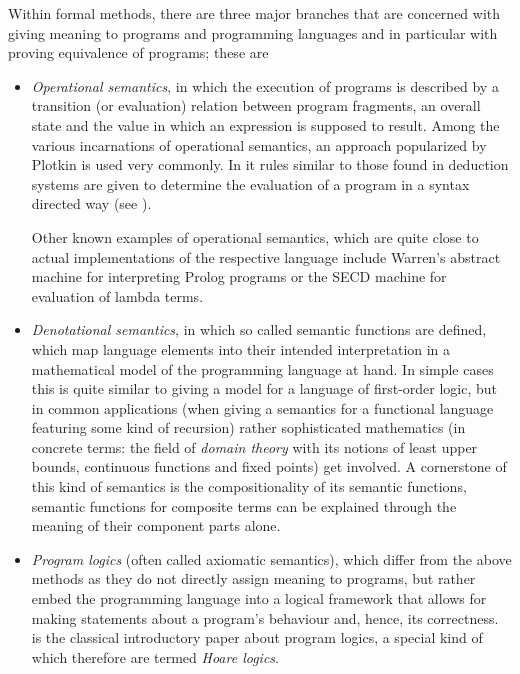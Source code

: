 Within formal methods, there are three major branches that are concerned with
giving meaning to programs and programming languages and in particular with proving
equivalence of programs; these are
\begin{itemize}
\item \emph{Operational semantics}, in which the execution of programs is
  described by a transition (or evaluation) relation between program fragments,
  an overall state and the value in which an expression is supposed to result.
  Among the various incarnations of operational semantics, an approach
  popularized by Plotkin is used very commonly. In it rules similar to those
  found in deduction systems are given to determine the evaluation of a program
   in a syntax directed way (see \cite{Plotkin81}).
  
  Other known examples of operational semantics, which are quite close to actual
  implementations of the respective language include Warren's abstract machine
  for interpreting Prolog programs or the SECD machine for evaluation of lambda
  terms.
\item \emph{Denotational semantics}, in which so called semantic functions are
  defined, which map language elements into their intended interpretation in a
  mathematical model of the programming language at hand.  In simple cases this
  is quite similar to giving a model for a language of first-order logic, but in
  common applications (\EG when giving a semantics for a functional language
  featuring some kind of recursion) rather sophisticated mathematics (in
  concrete terms: the field of \emph{domain theory} with its notions of
  least upper bounds, continuous functions and fixed points) get involved. A
  cornerstone of this kind of semantics is the compositionality of its semantic
  functions, \IE semantic functions for composite terms can be explained through
  the meaning of their component parts alone.
  
\item \emph{Program logics} (often called axiomatic semantics), which differ
  from the above methods as they do not directly assign meaning to programs, but
  rather embed the programming language into a logical framework that allows for
  making statements about a program's behaviour and, hence, its correctness.
  \cite{Hoare69} is the classical introductory paper about program logics, a
  special kind of which therefore are termed \emph{Hoare logics}.

\end{itemize}

